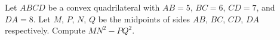 Let $ABCD$ be a convex quadrilateral with $AB=5$, $BC=6$, $CD=7$, and $DA=8$. Let $M$, $P$, $N$, $Q$ be the midpoints of sides $AB$, $BC$, $CD$, $DA$ respectively. Compute $MN^2-PQ^2$.